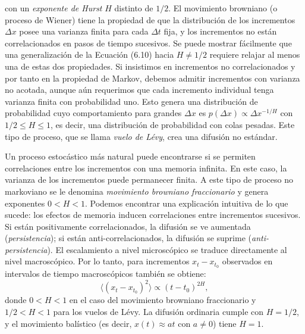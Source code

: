 \documentclass[10pt,a4paper]{book}
\begin{document}
con un \textit{exponente de Hurst} \(H\) distinto de \(1/2\). El movimiento browniano (o proceso de Wiener) tiene la propiedad de que la distribución de los incrementos \(\Delta x\) posee una varianza finita para cada \(\Delta t\) fija, y los incrementos no están correlacionados en pasos de tiempo sucesivos. Se puede mostrar fácilmente que una generalización de la Ecuación (6.10) hacia \(H \ne 1/2\) requiere relajar al menos una de estas dos propiedades. Si insistimos en incrementos no correlacionados y por tanto en la propiedad de Markov, debemos admitir incrementos con varianza no acotada, aunque aún requerimos que cada incremento individual tenga varianza finita con probabilidad uno. Esto genera una distribución de probabilidad cuyo comportamiento para grandes \(\Delta x\) es $p(\Delta x) \propto \Delta x^{-1/H}$ con \(1/2 \leq H \leq 1\), es decir, una distribución de probabilidad con colas pesadas. Este tipo de proceso, que se llama \textit{vuelo de Lévy}, crea una difusión no estándar.

\bigskip

Un proceso estocástico más natural puede encontrarse si se permiten correlaciones entre los incrementos con una memoria infinita. En este caso, la varianza de los incrementos puede permanecer finita. A este tipo de proceso no markoviano se le denomina \textit{movimiento browniano fraccionario} y genera exponentes \(0 < H < 1\). Podemos encontrar una explicación intuitiva de lo que sucede: los efectos de memoria inducen correlaciones entre incrementos sucesivos. Si están positivamente correlacionados, la difusión se ve aumentada (\textit{persistencia}); si están anti-correlacionados, la difusión se suprime (\textit{anti-persistencia}). El escalamiento a nivel microscópico se traduce directamente al nivel macroscópico. Por lo tanto, para incrementos \(x_t - x_{t_0}\) observados en intervalos de tiempo macroscópicos también se obtiene:
\begin{equation}
\langle (x_t - x_{t_0})^2 \rangle \propto (t - t_0)^{2H},
\end{equation}
donde \(0 < H < 1\) en el caso del movimiento browniano fraccionario y \(1/2 < H < 1\) para los vuelos de Lévy. La difusión ordinaria cumple con \(H = 1/2\), y el movimiento balístico (es decir, \(x(t) \approx at\) con \(a \ne 0\)) tiene \(H = 1\).

\bigskip
\end{document}
